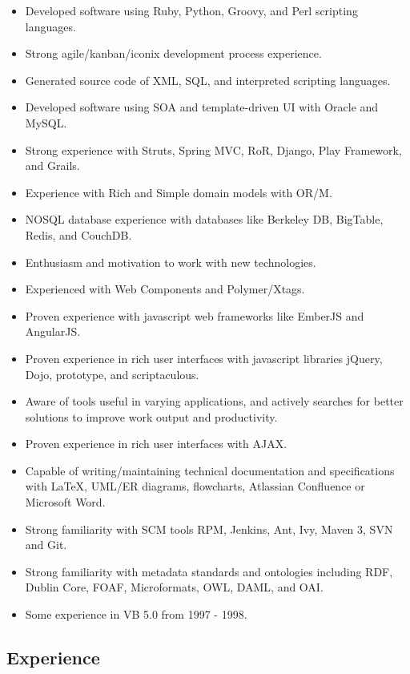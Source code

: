 \documentclass[10pt,letterpaper]{article}
\begin{document}
\begin{itemize}
\item Developed software using Ruby, Python, Groovy, and Perl scripting languages.
\item Strong agile/kanban/iconix development process experience.
\item Generated source code of XML, SQL, and interpreted scripting languages.
\item Developed software using SOA and template-driven UI with Oracle and MySQL.
\item Strong experience with Struts, Spring MVC, RoR, Django, Play Framework, and Grails.
\item Experience with Rich and Simple domain models with OR/M.
\item NOSQL database experience with databases like Berkeley DB, BigTable, Redis, and CouchDB.
\item Enthusiasm and motivation to work with new technologies.
\item Experienced with Web Components and Polymer/Xtags.
\item Proven experience with javascript web frameworks like EmberJS and AngularJS.
\item Proven experience in rich user interfaces with javascript libraries jQuery, Dojo, 
  prototype, and scriptaculous.
\item Aware of tools useful in varying applications, and actively
  searches for better solutions to improve work output and productivity.
\item Proven experience in rich user interfaces with AJAX.
\item Capable of writing/maintaining technical documentation and
  specifications with LaTeX, UML/ER diagrams, flowcharts, Atlassian Confluence or Microsoft Word.
\item Strong familiarity with SCM tools RPM, Jenkins, Ant, Ivy, Maven 3, SVN and Git.
\item Strong familiarity with metadata standards and ontologies
  including RDF, Dublin Core, FOAF, Microformats, OWL, DAML, and OAI.
\item Some experience in VB 5.0 from 1997 - 1998.
\end{itemize}

\subsection*{Experience}
\end{document}
